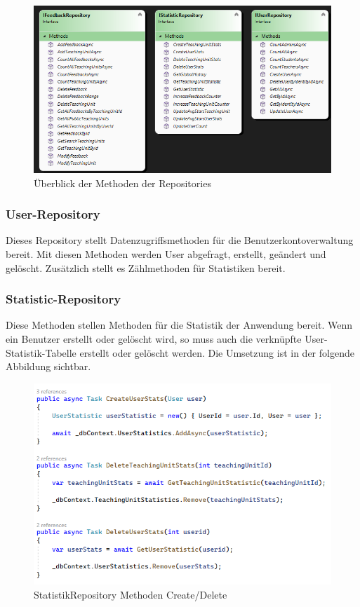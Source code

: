 \begin{figure}[h]
    \begin{center}
        \includegraphics[width=15cm]{./pics/overview-repo-interfaces.png}
    \caption[overview Repos]{Überblick der Methoden der Repositories}
    \end{center}
\end{figure}

\subsubsection{User-Repository}
\author{Stefano Pyringer}
Dieses Repository stellt Datenzugriffsmethoden für die Benutzerkontoverwaltung bereit. Mit diesen Methoden 
werden User abgefragt, erstellt, geändert und gelöscht. Zusätzlich stellt es Zählmethoden für Statistiken bereit.

\subsubsection{Statistic-Repository}
\author{Stefano Pyringer}
Diese Methoden stellen Methoden für die Statistik der Anwendung bereit. Wenn ein Benutzer erstellt oder gelöscht wird, 
so muss auch die verknüpfte User-Statistik-Tabelle erstellt oder gelöscht werden. Die Umsetzung ist in der folgende Abbildung sichtbar.

\begin{figure}[h]
    \begin{center}
        \includegraphics[width=15cm]{./pics/Persistance/UserStats.png}
    \caption[Userstats]{StatistikRepository Methoden Create/Delete}
    \end{center}
\end{figure}

